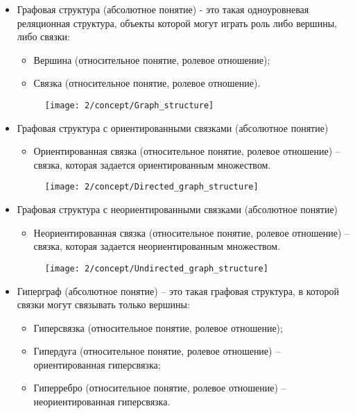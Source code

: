 \begin{itemize}
\item Графовая структура (абсолютное понятие) - это такая
  одноуровневая реляционная структура, объекты которой могут играть
  роль либо вершины, либо связки:
  \begin{itemize}
  \item Вершина (относительное понятие, ролевое отношение);
  \item Связка (относительное понятие, ролевое отношение).
  \end{itemize}

  \begin{figure}[h!]
    \centering
    \texttt{[image: 2/concept/Graph\_structure]}
    \label{fig:Concept_Graph_structure}
  \end{figure}

\newpage

\item Графовая структура с ориентированными связками (абсолютное
  понятие)
  \begin{itemize}
  \item Ориентированная связка (относительное понятие, ролевое
    отношение) – связка, которая задается ориентированным множеством.
  \end{itemize}

  \begin{figure}[h!]
    \centering
    \texttt{[image: 2/concept/Directed\_graph\_structure]}
    \label{fig:Concept_Directed_graph_structure}
  \end{figure}

\newpage

\item Графовая структура с неориентированными связками (абсолютное
  понятие)
  \begin{itemize}
  \item Неориентированная связка (относительное понятие, ролевое
    отношение) – связка, которая задается неориентированным
    множеством.
  \end{itemize}

  \begin{figure}[h!]
    \centering
    \texttt{[image: 2/concept/Undirected\_graph\_structure]}
    \label{fig:Concept_Undirected_graph_structure}
  \end{figure}

\newpage

\item Гиперграф (абсолютное понятие) – это такая графовая структура, в
  которой связки могут связывать только вершины:
  \begin{itemize}
  \item Гиперсвязка (относительное понятие, ролевое отношение);
  \item Гипердуга (относительное понятие, ролевое отношение) –
    ориентированная гиперсвязка;
  \item Гиперребро (относительное понятие, ролевое отношение) –
    неориентированная гиперсвязка.
  \end{itemize}


\end{itemize}
